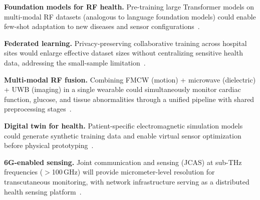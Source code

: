 \documentclass[journal,twoside]{IEEEtran}
\begin{document}
\textbf{Foundation models for RF health.} Pre-training large Transformer models on multi-modal RF datasets (analogous to language foundation models) could enable few-shot adaptation to new diseases and sensor configurations~\cite{ref_mlrf_sensing2025}.

\textbf{Federated learning.} Privacy-preserving collaborative training across hospital sites would enlarge effective dataset sizes without centralizing sensitive health data, addressing the small-sample limitation~\cite{ref_wearable_bp_ml2025}.

\textbf{Multi-modal RF fusion.} Combining FMCW (motion) + microwave (dielectric) + UWB (imaging) in a single wearable could simultaneously monitor cardiac function, glucose, and tissue abnormalities through a unified pipeline with shared preprocessing stages~\cite{ref_multimodal_eeg2024}.

\textbf{Digital twin for health.} Patient-specific electromagnetic simulation models could generate synthetic training data and enable virtual sensor optimization before physical prototyping~\cite{ref_comprehensive_dataset2024}.

\textbf{6G-enabled sensing.} Joint communication and sensing (JCAS) at sub-THz frequencies ($>$100\,GHz) will provide micrometer-level resolution for transcutaneous monitoring, with network infrastructure serving as a distributed health sensing platform~\cite{ref_mmwave_ml_review2023}.
\end{document}
